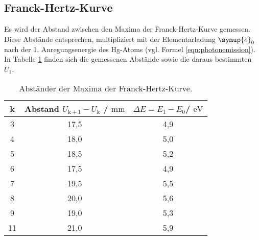 \subsection{Franck-Hertz-Kurve}
Es wird der Abstand zwischen den Maxima der Franck-Hertz-Kurve gemessen. Diese Abstände entsprechen, multipliziert mit der Elementarladung $\symup{e}_0$ nach \cite{e} der 1. Anregungsenergie des Hg-Atoms (vgl. Formel \eqref{eqn:photonemission}).
In Tabelle \ref{tab:hertzchen} finden sich die gemessenen Abstände sowie die daraus bestimmten $U_\mathrm{1}$.
\begin{table}
	\centering
	\caption{Abständer der Maxima der Franck-Hertz-Kurve.}
	\label{tab:hertzchen}
	\begin{tabular}{ccc}
		\toprule
		k& Abstand $U_{\mathrm{k+1}}-U_{\mathrm{k}}$ / $\si{\milli\meter}$ & $\Delta E=E_1 - E_0$/ $\si{\electronvolt}$ \\
		\midrule
3&17,5 & 4,9\\
4&18,0 & 5,0\\
5&18,5 & 5,2\\
6&17,5 & 4,9\\
7&19,5 & 5,5\\
8&20,0 & 5,6\\
9&19,0 & 5,3\\
11&21,0 & 5,9\\
\bottomrule
\end{tabular}
\end{table}

